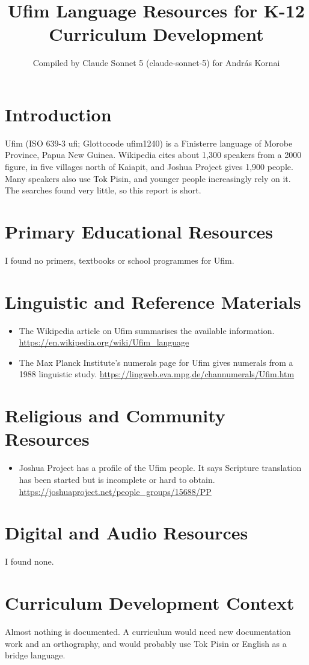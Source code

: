 \documentclass[12pt]{article}
\title{Ufim Language Resources for K-12 Curriculum Development}
\author{Compiled by Claude Sonnet 5 (claude-sonnet-5) for Andr\'as Kornai}
\date{}
\begin{document}
\maketitle

\section{Introduction}
Ufim (ISO 639-3 ufi; Glottocode ufim1240) is a Finisterre language of Morobe Province, Papua New Guinea. Wikipedia cites about 1,300 speakers from a 2000 figure, in five villages north of Kaiapit, and Joshua Project gives 1,900 people. Many speakers also use Tok Pisin, and younger people increasingly rely on it. The searches found very little, so this report is short.

\section{Primary Educational Resources}
I found no primers, textbooks or school programmes for Ufim.

\section{Linguistic and Reference Materials}
\begin{itemize}
\item The Wikipedia article on Ufim summarises the available information. \url{https://en.wikipedia.org/wiki/Ufim_language}
\item The Max Planck Institute's numerals page for Ufim gives numerals from a 1988 linguistic study. \url{https://lingweb.eva.mpg.de/channumerals/Ufim.htm}
\end{itemize}

\section{Religious and Community Resources}
\begin{itemize}
\item Joshua Project has a profile of the Ufim people. It says Scripture translation has been started but is incomplete or hard to obtain. \url{https://joshuaproject.net/people_groups/15688/PP}
\end{itemize}

\section{Digital and Audio Resources}
I found none.

\section{Curriculum Development Context}
Almost nothing is documented. A curriculum would need new documentation work and an orthography, and would probably use Tok Pisin or English as a bridge language.
\end{document}
